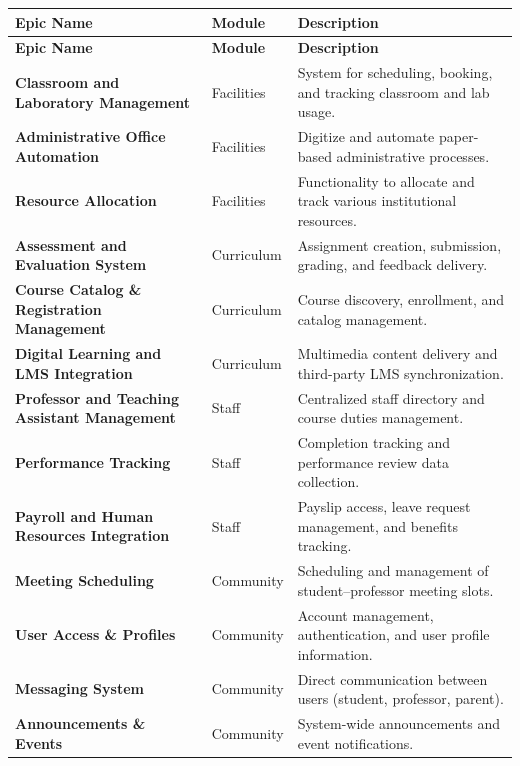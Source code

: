 \documentclass[12pt, a4paper]{article}
\begin{document}
{\small
\begin{longtable}{@{}>{\color{agileblue}\bfseries}L{0.28\textwidth}M{0.15\textwidth}L{0.49\textwidth}@{}}
\toprule
{}
\textbf{Epic Name} & \textbf{Module} & \textbf{Description} \\
\midrule
\endfirsthead
{}
\textbf{Epic Name} & \textbf{Module} & \textbf{Description} \\
\midrule
\endhead
\bottomrule
\endfoot
Classroom and Laboratory Management & Facilities & System for scheduling, booking, and tracking classroom and lab usage. \\
Administrative Office Automation & Facilities & Digitize and automate paper-based administrative processes. \\
Resource Allocation & Facilities & Functionality to allocate and track various institutional resources. \\
Assessment and Evaluation System & Curriculum & Assignment creation, submission, grading, and feedback delivery. \\
Course Catalog \& Registration Management & Curriculum & Course discovery, enrollment, and catalog management. \\
Digital Learning and LMS Integration & Curriculum & Multimedia content delivery and third-party LMS synchronization. \\
Professor and Teaching Assistant Management & Staff & Centralized staff directory and course duties management. \\
Performance Tracking & Staff & Completion tracking and performance review data collection. \\
Payroll and Human Resources Integration & Staff & Payslip access, leave request management, and benefits tracking. \\
Meeting Scheduling & Community & Scheduling and management of student--professor meeting slots. \\
User Access \& Profiles & Community & Account management, authentication, and user profile information. \\
Messaging System & Community & Direct communication between users (student, professor, parent). \\
Announcements \& Events & Community & System-wide announcements and event notifications. \\
\end{longtable}
}
\end{document}
